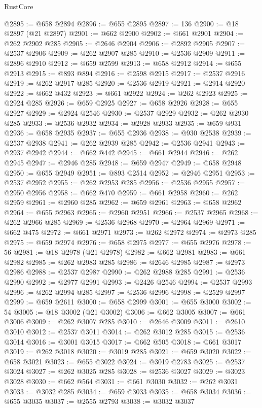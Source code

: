 \begin{lexlean}{RustCore}
\begin{coremodule}
@2895 := @658 @2894
@2896 := @655 @2895
@2897 := 136
@2900 := @18 @2897 (@21 @2897)
@2901 := @662 @2900
@2902 := @661 @2901
@2904 := @262 @2902 @285
@2905 := @2646 @2904
@2906 := @2892 @2905
@2907 := @2537 @2906
@2909 := @262 @2907 @285
@2910 := @2536 @2909
@2911 := @2896 @2910
@2912 := @659 @2599
@2913 := @658 @2912
@2914 := @655 @2913
@2915 := @893 @894
@2916 := @2598 @2915
@2917 := @2537 @2916
@2919 := @262 @2917 @285
@2920 := @2536 @2919
@2921 := @2914 @2920
@2922 := @662 @432
@2923 := @661 @2922
@2924 := @262 @2923
@2925 := @2924 @285
@2926 := @659 @2925
@2927 := @658 @2926
@2928 := @655 @2927
@2929 := @2924 @2546
@2930 := @2537 @2929
@2932 := @262 @2930 @285
@2933 := @2536 @2932
@2934 := @2928 @2933
@2935 := @659 @931
@2936 := @658 @2935
@2937 := @655 @2936
@2938 := @930 @2538
@2939 := @2537 @2938
@2941 := @262 @2939 @285
@2942 := @2536 @2941
@2943 := @2937 @2942
@2944 := @662 @442
@2945 := @661 @2944
@2946 := @262 @2945
@2947 := @2946 @285
@2948 := @659 @2947
@2949 := @658 @2948
@2950 := @655 @2949
@2951 := @893 @2514
@2952 := @2946 @2951
@2953 := @2537 @2952
@2955 := @262 @2953 @285
@2956 := @2536 @2955
@2957 := @2950 @2956
@2958 := @662 @470
@2959 := @661 @2958
@2960 := @262 @2959
@2961 := @2960 @285
@2962 := @659 @2961
@2963 := @658 @2962
@2964 := @655 @2963
@2965 := @2960 @2951
@2966 := @2537 @2965
@2968 := @262 @2966 @285
@2969 := @2536 @2968
@2970 := @2964 @2969
@2971 := @662 @475
@2972 := @661 @2971
@2973 := @262 @2972
@2974 := @2973 @285
@2975 := @659 @2974
@2976 := @658 @2975
@2977 := @655 @2976
@2978 := 56
@2981 := @18 @2978 (@21 @2978)
@2982 := @662 @2981
@2983 := @661 @2982
@2985 := @262 @2983 @285
@2986 := @2646 @2985
@2987 := @2973 @2986
@2988 := @2537 @2987
@2990 := @262 @2988 @285
@2991 := @2536 @2990
@2992 := @2977 @2991
@2993 := @2426 @2546
@2994 := @2537 @2993
@2996 := @262 @2994 @285
@2997 := @2536 @2996
@2998 := @2529 @2997
@2999 := @659 @2611
@3000 := @658 @2999
@3001 := @655 @3000
@3002 := 54
@3005 := @18 @3002 (@21 @3002)
@3006 := @662 @3005
@3007 := @661 @3006
@3009 := @262 @3007 @285
@3010 := @2646 @3009
@3011 := @2610 @3010
@3012 := @2537 @3011
@3014 := @262 @3012 @285
@3015 := @2536 @3014
@3016 := @3001 @3015
@3017 := @662 @505
@3018 := @661 @3017
@3019 := @262 @3018
@3020 := @3019 @285
@3021 := @659 @3020
@3022 := @658 @3021
@3023 := @655 @3022
@3024 := @3019 @2783
@3025 := @2537 @3024
@3027 := @262 @3025 @285
@3028 := @2536 @3027
@3029 := @3023 @3028
@3030 := @662 @564
@3031 := @661 @3030
@3032 := @262 @3031
@3033 := @3032 @285
@3034 := @659 @3033
@3035 := @658 @3034
@3036 := @655 @3035
@3037 := @2555 @2793
@3038 := @3032 @3037

\end{coremodule}
\end{lexlean}
